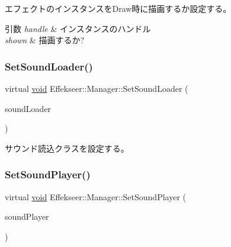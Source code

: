 エフェクトのインスタンスを\+Draw時に描画するか設定する。 


\begin{DoxyParams}{引数}
{\em handle} & インスタンスのハンドル \\
\hline
{\em shown} & 描画するか? \\
\hline
\end{DoxyParams}
\mbox{\label{class_effekseer_1_1_manager_afc9015a7a866accf73ab3b295bff8e06}} 
\subsubsection{\texorpdfstring{Set\+Sound\+Loader()}{SetSoundLoader()}}
{\footnotesize\ttfamily virtual \mbox{\hyperlink{namespace_effekseer_ab34c4088e512200cf4c2716f168deb56}{void}} Effekseer\+::\+Manager\+::\+Set\+Sound\+Loader (\begin{DoxyParamCaption}\item[{\mbox{\hyperlink{class_effekseer_1_1_sound_loader}{Sound\+Loader}} $\ast$}]{sound\+Loader }\end{DoxyParamCaption})\hspace{0.3cm}{\ttfamily [pure virtual]}}



サウンド読込クラスを設定する。 

\mbox{\label{class_effekseer_1_1_manager_af08602f559cd1f75bcaacfd8b1ec0840}} 
\subsubsection{\texorpdfstring{Set\+Sound\+Player()}{SetSoundPlayer()}}
{\footnotesize\ttfamily virtual \mbox{\hyperlink{namespace_effekseer_ab34c4088e512200cf4c2716f168deb56}{void}} Effekseer\+::\+Manager\+::\+Set\+Sound\+Player (\begin{DoxyParamCaption}\item[{\mbox{\hyperlink{class_effekseer_1_1_sound_player}{Sound\+Player}} $\ast$}]{sound\+Player }\end{DoxyParamCaption})\hspace{0.3cm}{\ttfamily [pure virtual]}}



